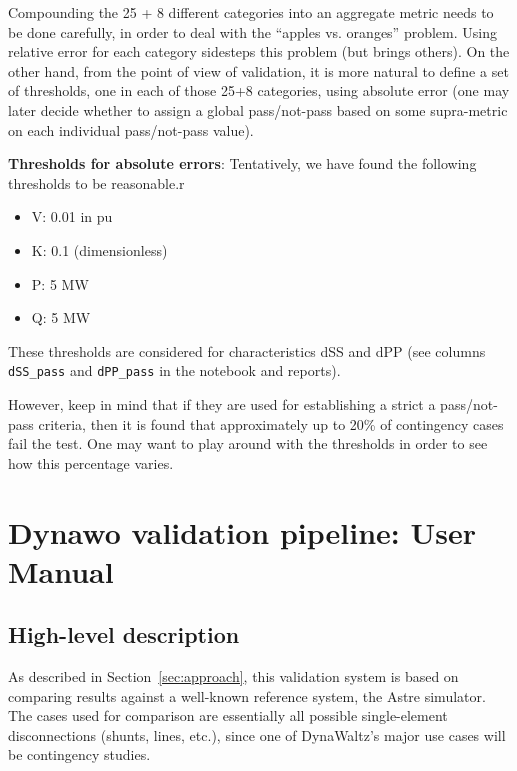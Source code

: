\documentclass[11pt, a4paper, twoside, titlepage]{article}
\newcommand{\code}[1]{\texttt{#1}}
\begin{document}

Compounding the 25 + 8 different categories into an aggregate metric
needs to be done carefully, in order to deal with the ``apples vs. oranges''
problem. Using relative error for each category sidesteps this problem (but
brings others).  On the other hand, from the point of view of validation, it is
more natural to define a set of thresholds, one in each of those 25+8
categories, using absolute error (one may later decide whether to assign a
global pass/not-pass based on some supra-metric on each individual pass/not-pass
value).

\noindent \textbf{Thresholds for absolute errors}: Tentatively, we
have found the following thresholds to be reasonable.r
\begin{itemize}
\item V: 0.01 in pu
\item K: 0.1 (dimensionless)
\item P: 5 MW
\item Q: 5 MW
\end{itemize}

These thresholds are considered for characteristics dSS and dPP (see
columns \code{dSS\_pass} and \code{dPP\_pass} in the notebook and
reports).

However, keep in mind that if they are used for establishing a strict
a pass/not-pass criteria, then it is found that approximately up to
20\% of contingency cases fail the test. One may want to play around
with the thresholds in order to see how this percentage varies.





\section{Dynawo validation pipeline: User Manual}
\label{sec:usermanual}

\subsection{High-level description}
\label{subsec:hl_intro}
As described in Section~\ref{sec:approach}, this validation system is
based on comparing results against a well-known reference system, the
Astre simulator. The cases used for comparison are essentially all
possible single-element disconnections (shunts, lines, etc.), since
one of DynaWaltz's major use cases will be contingency studies.
\end{document}
